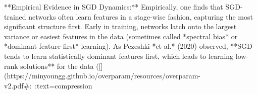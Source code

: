 **Empirical Evidence in SGD Dynamics:** Empirically, one finds that SGD-trained networks often learn features in a stage-wise fashion, capturing the most significant structure first. Early in training, networks latch onto the largest variance or easiest features in the data (sometimes called *spectral bias* or *dominant feature first* learning). As Pezeshki *et al.* (2020) observed, **SGD tends to learn statistically dominant features first, which leads to learning low-rank solutions** for the data ([](https://minyoungg.github.io/overparam/resources/overparam-v2.pdf#:~:text=compression%

